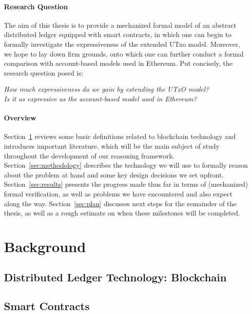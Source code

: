 \documentclass[acmsmall,nonacm=true,screen=true]{acmart}\settopmatter{printfolios=false,printccs=false,printacmref=false}
\begin{document}
\paragraph{Research Question}
The aim of this thesis is to provide a mechanized formal model of an abstract distributed ledger equipped with
smart contracts, in which one can begin to formally investigate the expressiveness of the extended UTxo model.
Moreover, we hope to lay down firm grounds, onto which one can further conduct a formal comparison with account-based
models used in Ethereum. Put concisely, the research question posed is:
\begin{displayquote}
	\textit{How much expressiveness do we gain by extending the UTxO model?} \\
	\textit{Is it as expressive as the account-based model used in Ethereum?}
\end{displayquote}

\paragraph{Overview}
Section~\ref{sec:background} reviews some basic definitions related to blockchain
technology and introduces important literature, which will be the main subject of study
throughout the development of our reasoning framework.
Section~\ref{sec:methodology} describes the technology we will use to formally reason
about the problem at hand and some key design decisions we set upfront.
Section~\ref{sec:results} presents the progress made thus far in terms of (mechanized) formal verification,
as well as problems we have encountered and also expect along the way.
Section~\ref{sec:plan} discusses next steps for the remainder of the thesis, as well as a rough estimate
on when these milestones will be completed.

\section{Background}
\label{sec:background}

\subsection{Distributed Ledger Technology: Blockchain}

\subsection{Smart Contracts}
\end{document}

